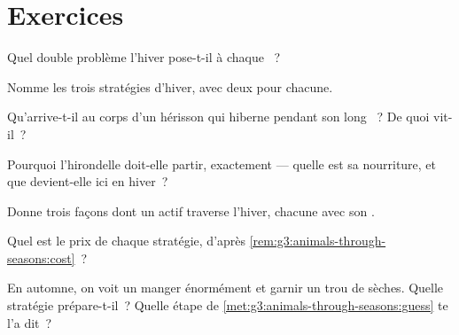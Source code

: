 \section{Exercices}

\begin{exercise}[$\star$]\label{exo:g3:animals-through-seasons:1}
Quel double problème l'hiver pose-t-il à chaque ~?
\end{exercise}

\begin{exercise}[$\star$]\label{exo:g3:animals-through-seasons:2}
Nomme les trois stratégies d'hiver, avec deux  pour chacune.
\end{exercise}

\begin{exercise}[$\star$]\label{exo:g3:animals-through-seasons:3}
Qu'arrive-t-il au corps d'un hérisson qui hiberne pendant son long
~? De quoi vit-il~?
\end{exercise}

\begin{exercise}[$\star$]\label{exo:g3:animals-through-seasons:4}
Pourquoi l'hirondelle doit-elle partir, exactement --- quelle est sa
nourriture, et que devient-elle ici en hiver~?
\end{exercise}

\begin{exercise}[$\star$]\label{exo:g3:animals-through-seasons:5}
Donne trois façons dont un  actif traverse l'hiver, chacune
avec son .
\end{exercise}

\begin{exercise}[$\star$]\label{exo:g3:animals-through-seasons:6}
Quel est le prix de chaque stratégie, d'après
\cref{rem:g3:animals-through-seasons:cost}~?
\end{exercise}

\begin{exercise}[$\star$]\label{exo:g3:animals-through-seasons:7}
En automne, on voit un  manger énormément et garnir un trou de
 sèches. Quelle stratégie prépare-t-il~? Quelle étape de
\cref{met:g3:animals-through-seasons:guess} te l'a dit~?
\end{exercise}

